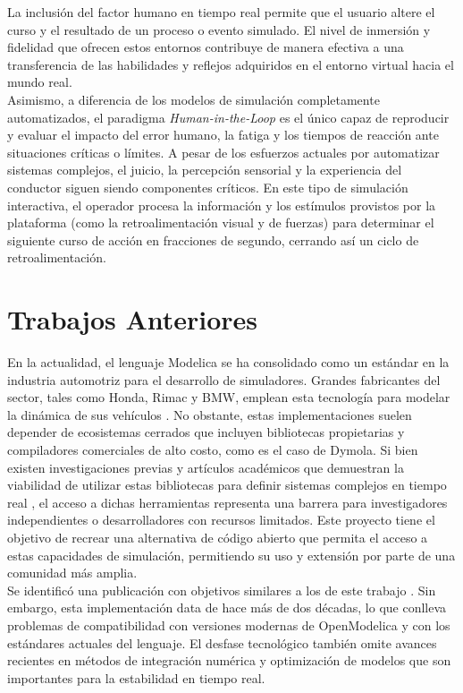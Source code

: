 La inclusión del factor humano en tiempo real permite que el usuario altere el curso y el resultado de un proceso o evento simulado. El nivel de inmersión y fidelidad que ofrecen estos entornos contribuye de manera efectiva a una transferencia de las habilidades y reflejos adquiridos en el entorno virtual hacia el mundo real. \\

Asimismo, a diferencia de los modelos de simulación completamente automatizados, el paradigma \textit{Human-in-the-Loop} es el único capaz de reproducir y evaluar el impacto del error humano, la fatiga y los tiempos de reacción ante situaciones críticas o límites. A pesar de los esfuerzos actuales por automatizar sistemas complejos, el juicio, la percepción sensorial y la experiencia del conductor siguen siendo componentes críticos. En este tipo de simulación interactiva, el operador procesa la información y los estímulos provistos por la plataforma (como la retroalimentación visual y de fuerzas) para determinar el siguiente curso de acción en fracciones de segundo, cerrando así un ciclo de retroalimentación.


\section{Trabajos Anteriores}
En la actualidad, el lenguaje Modelica se ha consolidado como un estándar en la industria automotriz para el desarrollo de simuladores. Grandes fabricantes del sector, tales como Honda, Rimac y BMW, emplean esta tecnología para modelar la dinámica de sus vehículos \cite{modelon}. No obstante, estas implementaciones suelen depender de ecosistemas cerrados que incluyen bibliotecas propietarias y compiladores comerciales de alto costo, como es el caso de Dymola. Si bien existen investigaciones previas y artículos académicos que demuestran la viabilidad de utilizar estas bibliotecas para definir sistemas complejos en tiempo real \cite{modelicart}, el acceso a dichas herramientas representa una barrera para investigadores independientes o desarrolladores con recursos limitados. Este proyecto tiene el objetivo de recrear una alternativa de código abierto que permita el acceso a estas capacidades de simulación, permitiendo su uso y extensión por parte de una comunidad más amplia. \\

Se identificó una publicación con objetivos similares a los de este trabajo \cite{modelica2003}. Sin embargo, esta implementación data de hace más de dos décadas, lo que conlleva problemas de compatibilidad con versiones modernas de OpenModelica y con los estándares actuales del lenguaje. El desfase tecnológico también omite avances recientes en métodos de integración numérica y optimización de modelos que son importantes para la estabilidad en tiempo real. \\

